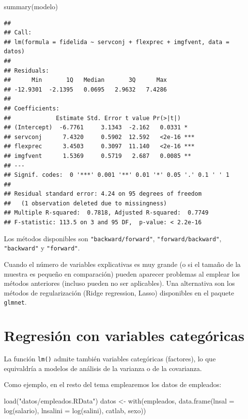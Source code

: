 \documentclass[
]{book}
\newenvironment{Shaded}{\begin{snugshade}}{\end{snugshade}}
\newcommand{\AttributeTok}[1]{\textcolor[rgb]{0.77,0.63,0.00}{#1}}
\newcommand{\FunctionTok}[1]{\textcolor[rgb]{0.00,0.00,0.00}{#1}}
\newcommand{\NormalTok}[1]{#1}
\newcommand{\OtherTok}[1]{\textcolor[rgb]{0.56,0.35,0.01}{#1}}
\newcommand{\StringTok}[1]{\textcolor[rgb]{0.31,0.60,0.02}{#1}}
\theoremstyle{break}
\theoremstyle{nonumberplain}
\begin{document}
\begin{Shaded}
\begin{Highlighting}[]
\FunctionTok{summary}\NormalTok{(modelo)}
\end{Highlighting}
\end{Shaded}

\begin{verbatim}
## 
## Call:
## lm(formula = fidelida ~ servconj + flexprec + imgfvent, data = datos)
## 
## Residuals:
##      Min       1Q   Median       3Q      Max 
## -12.9301  -2.1395   0.0695   2.9632   7.4286 
## 
## Coefficients:
##             Estimate Std. Error t value Pr(>|t|)    
## (Intercept)  -6.7761     3.1343  -2.162   0.0331 *  
## servconj      7.4320     0.5902  12.592   <2e-16 ***
## flexprec      3.4503     0.3097  11.140   <2e-16 ***
## imgfvent      1.5369     0.5719   2.687   0.0085 ** 
## ---
## Signif. codes:  0 '***' 0.001 '**' 0.01 '*' 0.05 '.' 0.1 ' ' 1
## 
## Residual standard error: 4.24 on 95 degrees of freedom
##   (1 observation deleted due to missingness)
## Multiple R-squared:  0.7818, Adjusted R-squared:  0.7749 
## F-statistic: 113.5 on 3 and 95 DF,  p-value: < 2.2e-16
\end{verbatim}

Los métodos disponibles son \texttt{"backward/forward"}, \texttt{"forward/backward"}, \texttt{"backward"} y \texttt{"forward"}.

Cuando el número de variables explicativas es muy grande (o si el tamaño de la muestra es pequeño en comparación) pueden aparecer problemas al emplear los métodos anteriores (incluso pueden no ser aplicables). Una alternativa son los métodos de regularización (Ridge regression, Lasso) disponibles en el paquete \texttt{glmnet}.

\hypertarget{regresiuxf3n-con-variables-categuxf3ricas}{%
\section{Regresión con variables categóricas}\label{regresiuxf3n-con-variables-categuxf3ricas}}

La función \texttt{lm()} admite también variables categóricas (factores), lo que equivaldría a modelos de análisis de la varianza o de la covarianza.

Como ejemplo, en el resto del tema emplearemos los datos de empleados:

\begin{Shaded}
\begin{Highlighting}[]
\FunctionTok{load}\NormalTok{(}\StringTok{"datos/empleados.RData"}\NormalTok{)}
\NormalTok{datos }\OtherTok{\textless{}{-}} \FunctionTok{with}\NormalTok{(empleados, }\FunctionTok{data.frame}\NormalTok{(}\AttributeTok{lnsal =} \FunctionTok{log}\NormalTok{(salario), }\AttributeTok{lnsalini =} \FunctionTok{log}\NormalTok{(salini), catlab, sexo))}
\end{Highlighting}
\end{Shaded}
\end{document}
